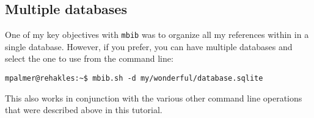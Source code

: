 \documentclass[10pt]{article}
\newcommand*{\mbib}{\texttt{mbib}\xspace}
\begin{document}
\subsection{Multiple databases}

One of my key objectives with \mbib was to organize all my references within in a single database. However, if you prefer, you can have multiple databases and select the one to use from the command line: 

\begin{verbatim}
mpalmer@rehakles:~$ mbib.sh -d my/wonderful/database.sqlite
\end{verbatim}

\noindent This also works in conjunction with the various other command line operations that were described above in this tutorial. 

\begin{comment}
\section{Running \mbib}

The program runs inside a console window. Assuming you have put a start-up script into your shell's path, just open a shell window (e.g.\ \texttt{konsole} on KDE, or \texttt{xterm} on any X-based desktop) and run \texttt{mbib.sh}.

%
%




\subsection{The user interface}

\begin{itemize}
\item navigation (mouse, keyboard)
\item viewing and editing references
\item importing references
\item moving things around (using selections)
\item searching and filtering
\item using the clipboard (requires xclip)
\item 
\end{itemize}

\end{comment}
\end{document}
